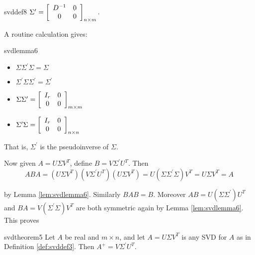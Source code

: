 \begin{definition}{}{svddef8} 
$\Sigma^{\prime }=
\left[ 
\begin{array}{cc}
D^{-1} & 0 \\ 
0 & 0
\end{array}
\right]_{n\times m}.$
\end{definition}

\noindent A routine calculation gives:

\begin{lemma}{}{svdlemma6}
\begin{multicols}{2}
\begin{itemize}
\item $\Sigma \Sigma^{\prime }\Sigma =\Sigma$
\item $\Sigma^{\prime }\Sigma \Sigma^{\prime }=\Sigma^{\prime }$
\columnbreak
\item $\Sigma \Sigma^{\prime }= 
\left[ 
\begin{array}{cc}
I_{r} & 0 \\ 
0 & 0
\end{array}
\right]_{m\times m}$
\item $\Sigma^{\prime }\Sigma =
\left[ 
\begin{array}{cc}
I_{r} & 0 \\ 
0 & 0
\end{array}
\right]_{n\times n}$
\end{itemize}
\end{multicols}
\vspace*{0.1em}
\end{lemma}

\noindent That is, $\Sigma^{\prime }$ is the pseudoinverse of $\Sigma$.

Now given $A=U\Sigma V^{T}$, define $B=V\Sigma^{\prime }U^{T}$. Then
\begin{equation*}
ABA=(U\Sigma V^{T})(V\Sigma^{\prime }U^{T})(U\Sigma V^{T})=U(\Sigma
\Sigma^{\prime }\Sigma )V^{T}=U\Sigma V^{T}=A
\end{equation*}

\noindent by Lemma \ref{lem:svdlemma6}. Similarly $BAB=B$. Moreover $AB=U(\Sigma \Sigma^{\prime })U^{T}$ and $BA=V(\Sigma^{\prime }\Sigma )V^{T}$ are both
symmetric again by Lemma \ref{lem:svdlemma6}. This proves

\begin{theorem}{}{svdtheorem5}
Let $A$ be real and $m\times n$, and let $A=U\Sigma V^{T}$ is any SVD for $A$ as in Definition \ref{def:svddef3}. Then $A^{+}=V\Sigma^{\prime }U^{T}$.
\end{theorem}

